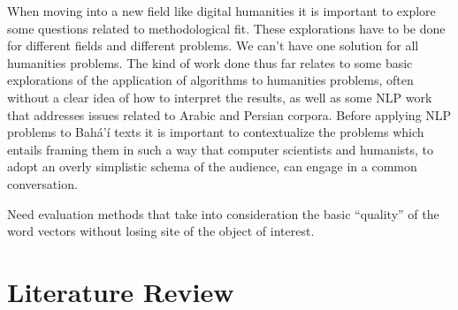 \documentclass[12pt, oneside]{report}
\begin{document}
When moving into a new field like digital humanities it is important to explore some questions related to methodological fit. These explorations have to be done for different fields and different problems. We can't have one solution for all humanities problems. The kind of work done thus far relates to some basic explorations of the application of algorithms to humanities problems, often without a clear idea of how to interpret the results, as well as some NLP work that addresses issues related to Arabic and Persian corpora. Before applying NLP problems to Bah\'{a}'\'{i} texts it is important to contextualize the problems which entails framing them in such a way that computer scientists and humanists, to adopt an overly simplistic schema of the audience, can engage in a common conversation.

Need evaluation methods that take into consideration the basic “quality” of the word vectors without losing site of the object of interest.

\chapter{Literature Review}
\end{document}
